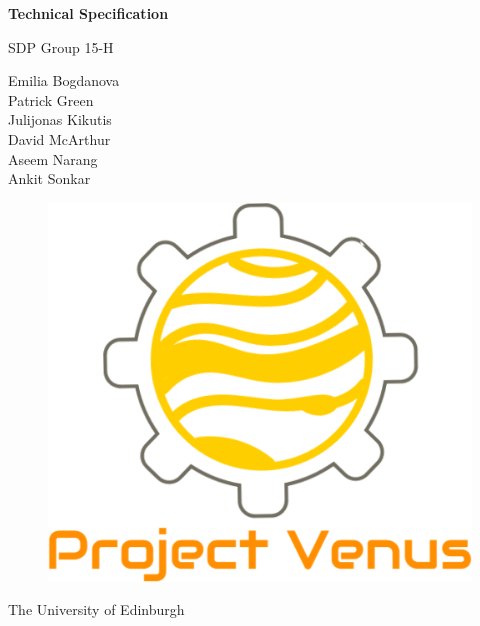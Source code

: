 \documentclass[a4paper,12pt]{article}
\begin{document}
\begin{titlepage}
    \begin{center}
        \vspace*{1cm}
        
        \Huge
        \textbf{Technical Specification}
        
        \vspace{0.5cm}
        \LARGE
        SDP Group 15-H
        
        \vspace{1.5cm}
        \normalsize
		Emilia Bogdanova\\
		Patrick Green\\
        Julijonas Kikutis\\ 
		David McArthur\\
		Aseem Narang\\
		Ankit Sonkar\\
        
        \vfill
        
        
        \vspace{0.8cm}
        
        \begin{figure}
    	\vspace*{-2.5em}
    	\centering
    	\includegraphics[scale=.30]{logo.png}
		\end{figure}
        
        \Large
        The University of Edinburgh\\
        
    \end{center}
\end{titlepage}
\end{document}
